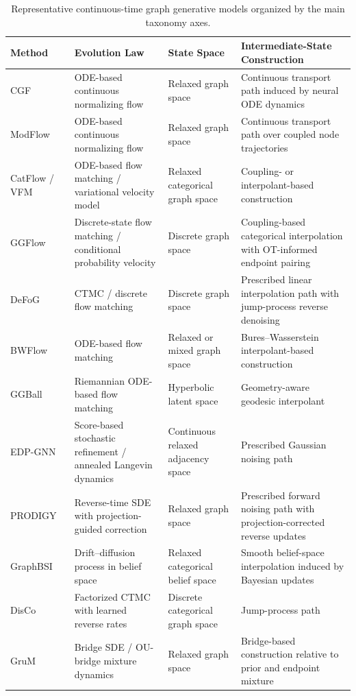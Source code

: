 \documentclass{article}
\begin{document}
\begin{table}[!t]
\centering
\caption{Representative continuous-time graph generative models organized by the main taxonomy axes.}
\label{tab:taxonomy_models_continuous}
\small
\renewcommand{\arraystretch}{1.15}
\setlength{\tabcolsep}{4pt}
\begin{tabularx}{\textwidth}{|
    >{\raggedright\arraybackslash}p{2.8cm}|
    >{\raggedright\arraybackslash}p{2.9cm}|
    >{\raggedright\arraybackslash}p{2.5cm}|
    >{\raggedright\arraybackslash}X|}
\hline
\textbf{Method} & \textbf{Evolution Law} & \textbf{State Space} & \textbf{Intermediate-State Construction} \\
\hline
CGF~\cite{deng2019continuous} & ODE-based continuous normalizing flow & Relaxed graph space & Continuous transport path induced by neural ODE dynamics \\
\hline
ModFlow~\cite{verma2022modular} & ODE-based continuous normalizing flow & Relaxed graph space & Continuous transport path over coupled node trajectories \\
\hline
CatFlow / VFM~\cite{eijkelboom2024vfm} & ODE-based flow matching / variational velocity model & Relaxed categorical graph space & Coupling- or interpolant-based construction \\
\hline
GGFlow~\cite{hou2024ggflow} & Discrete-state flow matching / conditional probability velocity & Discrete graph space & Coupling-based categorical interpolation with OT-informed endpoint pairing \\
\hline
DeFoG~\cite{qin2025defog} & CTMC / discrete flow matching & Discrete graph space & Prescribed linear interpolation path with jump-process reverse denoising \\
\hline
BWFlow~\cite{bwflow} & ODE-based flow matching & Relaxed or mixed graph space & Bures--Wasserstein interpolant-based construction \\
\hline
GGBall~\cite{ggball} & Riemannian ODE-based flow matching & Hyperbolic latent space & Geometry-aware geodesic interpolant \\
\hline
EDP-GNN~\cite{niu2020permutation} & Score-based stochastic refinement / annealed Langevin dynamics & Continuous relaxed adjacency space & Prescribed Gaussian noising path \\
\hline
PRODIGY~\cite{sharma2024plug} & Reverse-time SDE with projection-guided correction & Relaxed graph space & Prescribed forward noising path with projection-corrected reverse updates \\
\hline
GraphBSI~\cite{song2025smooth} & Drift--diffusion process in belief space & Relaxed categorical belief space & Smooth belief-space interpolation induced by Bayesian updates \\
\hline
DisCo~\cite{xu2024discrete} & Factorized CTMC with learned reverse rates & Discrete categorical graph space & Jump-process path \\
\hline
GruM~\cite{jo2023graph} & Bridge SDE / OU-bridge mixture dynamics & Relaxed graph space & Bridge-based construction relative to prior and endpoint mixture \\
\hline
\end{tabularx}
\end{table}
\end{document}
